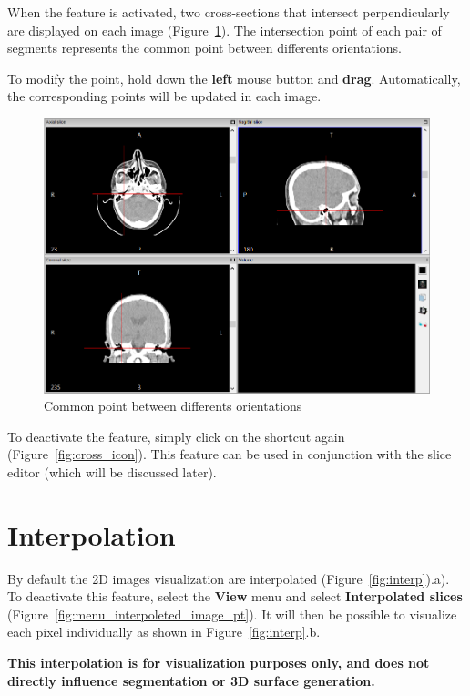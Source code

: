 When the feature is activated, two cross-sections that intersect perpendicularly are displayed on each image (Figure~\ref{fig:cross_all}). The intersection point of each pair of segments represents the common point between differents orientations.

\newpage

To modify the point, hold down the \textbf{left} mouse button and \textbf{drag}. Automatically, the corresponding points will be updated in each image.

\begin{figure}[!htb]
\centering
\includegraphics[scale=0.4]{../user_guide_figures/invesalius_screen/multiplanar_window_cross_en.png}
\caption{Common point between differents orientations}
\label{fig:cross_all}
\end{figure}

To deactivate the feature, simply click on the shortcut again (Figure~\ref{fig:cross_icon}). This feature can be used in conjunction with the slice editor (which will be discussed later).

\section{Interpolation}

By default the 2D images visualization are interpolated (Figure~\ref{fig:interp}).a). To deactivate this feature, select the \textbf{View} menu and select \textbf{Interpolated slices} (Figure~\ref{fig:menu_interpoleted_image_pt}). It will then be possible to visualize each pixel individually as shown in Figure~\ref{fig:interp}.b.

\textbf{This interpolation is for visualization purposes only, and does not directly influence segmentation or 3D surface generation.}

